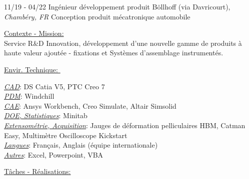 \documentclass[]{friggeri-cv}
\begin{document}
\begin{entrylist}
  \entry
    {11/19 - 04/22}
    {Ingénieur développement produit}
    {Böllhoff (via Davricourt), \textit{Chambéry, FR}}
    {Conception produit mécatronique automobile}
\end{entrylist}
\vspace{-10pt}
\begin{minipage}[t]{0.65\linewidth}
\underline{Contexte - Mission: }\\
Service R\&D Innovation, développement d'une nouvelle gamme de produits à haute valeur ajoutée - fixations et Systèmes d'assemblage instrumentés.\\
\end{minipage} %
\begin{minipage}[t]{0.38\textwidth}
    \underline{Envir. Technique: }\
    \vspace{1mm}
    
\underline{\textit{CAD}}: DS Catia V5, PTC Creo 7\\
\underline{\textit{PDM}}: Windchill\\
\underline{\textit{CAE}}: Ansys Workbench, Creo Simulate, Altair Simsolid\\
\underline{\textit{DOE, Statistiques}}: Minitab\\
\underline{\textit{Extensométrie, Acquisition}}: Jauges de déformation pelliculaires HBM, Catman Easy, Multimètre Oscilloscope Kickstart\\
\underline{\textit{Langues}}: Français, Anglais (équipe internationale)\\
\underline{\textit{Autres}}: Excel, Powerpoint, VBA
    \end{minipage}
\vspace{1.5mm}
\underline{Tâches - Réalisations: }\\
\end{document}
